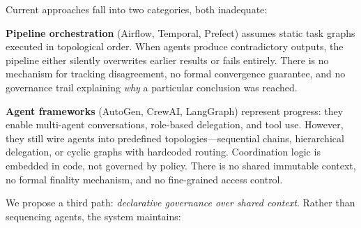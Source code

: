 \documentclass[11pt]{article}
\begin{document}
Current approaches fall into two categories, both inadequate:

\textbf{Pipeline orchestration} (Airflow, Temporal, Prefect) assumes static task graphs executed in topological order. When agents produce contradictory outputs, the pipeline either silently overwrites earlier results or fails entirely. There is no mechanism for tracking disagreement, no formal convergence guarantee, and no governance trail explaining \emph{why} a particular conclusion was reached.

\textbf{Agent frameworks} (AutoGen, CrewAI, LangGraph) represent progress: they enable multi-agent conversations, role-based delegation, and tool use. However, they still wire agents into predefined topologies---sequential chains, hierarchical delegation, or cyclic graphs with hardcoded routing. Coordination logic is embedded in code, not governed by policy. There is no shared immutable context, no formal finality mechanism, and no fine-grained access control.

We propose a third path: \emph{declarative governance over shared context}. Rather than sequencing agents, the system maintains:
\end{document}
